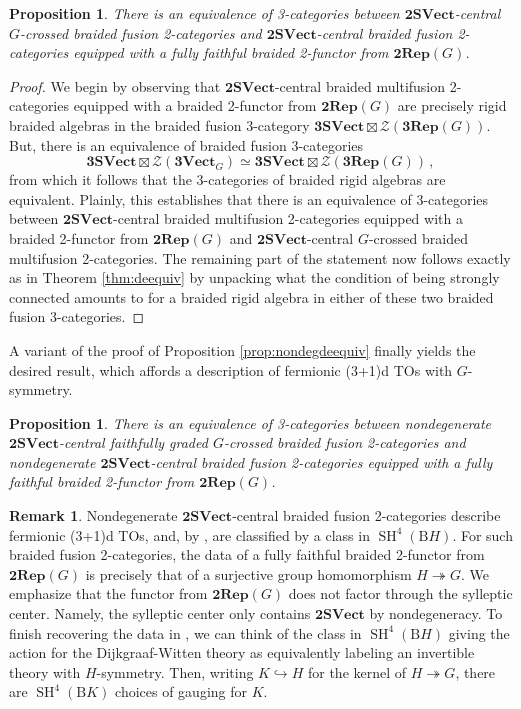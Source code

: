 \documentclass[11pt,reqno]{amsart}
\DeclareMathOperator{\SH}{SH}
\newcommand{\tSVect}{\mathbf{2SVect}}
\newcommand{\tRep}{\mathbf{2Rep}}
\newcommand{\rB}{\mathrm{B}}
\numberwithin{equation}{section}
\theoremstyle{plain}
\newtheorem{prop}[equation]{Proposition}
\theoremstyle{definition}
\newtheorem{rem}[equation]{Remark}
\begin{document}
\begin{prop}\label{prop:application}
There is an equivalence of 3-categories between
$\mathbf{2SVect}$-central $G$-crossed braided fusion 2-categories and $\mathbf{2SVect}$-central braided fusion 2-categories equipped with a fully faithful braided 2-functor from $\mathbf{2Rep}(G)$.
\end{prop}
\begin{proof}
We begin by observing that $\mathbf{2SVect}$-central braided multifusion 2-categories equipped with a braided 2-functor from $\mathbf{2Rep}(G)$ are precisely rigid braided algebras in the braided fusion 3-category $\mathbf{3SVect}\boxtimes\mathcal{Z}(\mathbf{3Rep}(G))$.
But, there is an equivalence of braided fusion 3-categories
$$\mathbf{3SVect}\boxtimes \mathcal{Z}(\mathbf{3Vect}_G)\simeq \mathbf{3SVect}\boxtimes\mathcal{Z}(\mathbf{3Rep}(G))\,,$$
from which it follows that the 3-categories of braided rigid algebras are equivalent. Plainly, this establishes that there is an equivalence of 3-categories between $\mathbf{2SVect}$-central braided multifusion 2-categories equipped with a braided 2-functor from $\mathbf{2Rep}(G)$ and $\mathbf{2SVect}$-central $G$-crossed braided multifusion 2-categories.
The remaining part of the statement now follows exactly as in Theorem \ref{thm:deequiv} by unpacking what the condition of being strongly connected amounts to for a braided rigid algebra in either of these two braided fusion 3-categories.
\end{proof}

A variant of the proof of Proposition \ref{prop:nondegdeequiv} finally yields the desired result, which affords a description of fermionic (3+1)d TOs with $G$-symmetry.

\begin{prop}\label{prop:genuinelyfermionicTOclassification}
There is an equivalence of 3-categories between nondegenerate
$\mathbf{2SVect}$-central faithfully graded $G$-crossed braided fusion 2-categories and nondegenerate $\mathbf{2SVect}$-central braided fusion 2-categories equipped with a fully faithful braided 2-functor from $\mathbf{2Rep}(G)$.
\end{prop}

\begin{rem}
Nondegenerate $\mathbf{2SVect}$-central braided fusion 2-categories describe fermionic (3+1)d TOs, and, by , are classified by a class in $\SH^4(\rB H)$.
For such braided fusion 2-categories, the data of a fully faithful braided 2-functor from $\mathbf{2Rep}(G)$ is precisely that of a surjective group homomorphism $H \twoheadrightarrow G$. We emphasize that the functor from $\tRep(G)$ does not factor through the sylleptic center. Namely, the sylleptic center only contains $\tSVect$ by nondegeneracy.
To finish recovering the data in , we can think of the class in $\SH^4(\rB H)$ giving the action for the Dijkgraaf-Witten theory as equivalently labeling an invertible theory with $H$-symmetry. Then, writing $K \hookrightarrow H$ for the kernel of $H \twoheadrightarrow G$, there are $\SH^4(\rB K)$ choices of gauging for $K$.
\end{rem}
\end{document}
